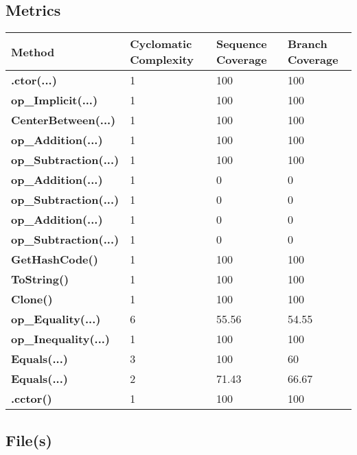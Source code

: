 \documentclass[a4paper,10pt]{article}
\begin{document}
\subsection{Metrics}
\begin{longtable}[l]{|l|l|l|l|}
\hline
\textbf{Method} & \textbf{Cyclomatic Complexity} & \textbf{Sequence Coverage} & \textbf{Branch Coverage}\\
\hline
\textbf{.ctor(...)} & 1 & 100 & 100\\
\hline
\textbf{op\_Implicit(...)} & 1 & 100 & 100\\
\hline
\textbf{CenterBetween(...)} & 1 & 100 & 100\\
\hline
\textbf{op\_Addition(...)} & 1 & 100 & 100\\
\hline
\textbf{op\_Subtraction(...)} & 1 & 100 & 100\\
\hline
\textbf{op\_Addition(...)} & 1 & 0 & 0\\
\hline
\textbf{op\_Subtraction(...)} & 1 & 0 & 0\\
\hline
\textbf{op\_Addition(...)} & 1 & 0 & 0\\
\hline
\textbf{op\_Subtraction(...)} & 1 & 0 & 0\\
\hline
\textbf{GetHashCode()} & 1 & 100 & 100\\
\hline
\textbf{ToString()} & 1 & 100 & 100\\
\hline
\textbf{Clone()} & 1 & 100 & 100\\
\hline
\textbf{op\_Equality(...)} & 6 & 55.56 & 54.55\\
\hline
\textbf{op\_Inequality(...)} & 1 & 100 & 100\\
\hline
\textbf{Equals(...)} & 3 & 100 & 60\\
\hline
\textbf{Equals(...)} & 2 & 71.43 & 66.67\\
\hline
\textbf{.cctor()} & 1 & 100 & 100\\
\hline
\end{longtable}
\subsection{File(s)}
\end{document}
